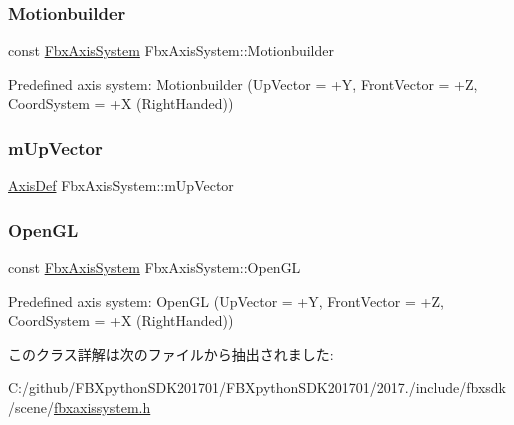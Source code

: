\subsubsection{\texorpdfstring{Motionbuilder}{Motionbuilder}}
{\footnotesize\ttfamily const \hyperlink{class_fbx_axis_system}{Fbx\+Axis\+System} Fbx\+Axis\+System\+::\+Motionbuilder\hspace{0.3cm}{\ttfamily [static]}}



Predefined axis system\+: Motionbuilder (Up\+Vector = +Y, Front\+Vector = +Z, Coord\+System = +X (Right\+Handed)) 

\mbox{\label{class_fbx_axis_system_afdefd4d8b257567fe099e28dd1745cfe}} 
\subsubsection{\texorpdfstring{m\+Up\+Vector}{mUpVector}}
{\footnotesize\ttfamily \hyperlink{class_fbx_axis_system_1_1_axis_def}{Axis\+Def} Fbx\+Axis\+System\+::m\+Up\+Vector\hspace{0.3cm}{\ttfamily [protected]}}

\mbox{\label{class_fbx_axis_system_a30249cc37f848cdac27b77d3520f4e28}} 
\subsubsection{\texorpdfstring{Open\+GL}{OpenGL}}
{\footnotesize\ttfamily const \hyperlink{class_fbx_axis_system}{Fbx\+Axis\+System} Fbx\+Axis\+System\+::\+Open\+GL\hspace{0.3cm}{\ttfamily [static]}}



Predefined axis system\+: Open\+GL (Up\+Vector = +Y, Front\+Vector = +Z, Coord\+System = +X (Right\+Handed)) 



このクラス詳解は次のファイルから抽出されました\+:\begin{DoxyCompactItemize}
\item 
C\+:/github/\+F\+B\+Xpython\+S\+D\+K201701/\+F\+B\+Xpython\+S\+D\+K201701/2017./include/fbxsdk/scene/\hyperlink{fbxaxissystem_8h}{fbxaxissystem.\+h}\end{DoxyCompactItemize}
